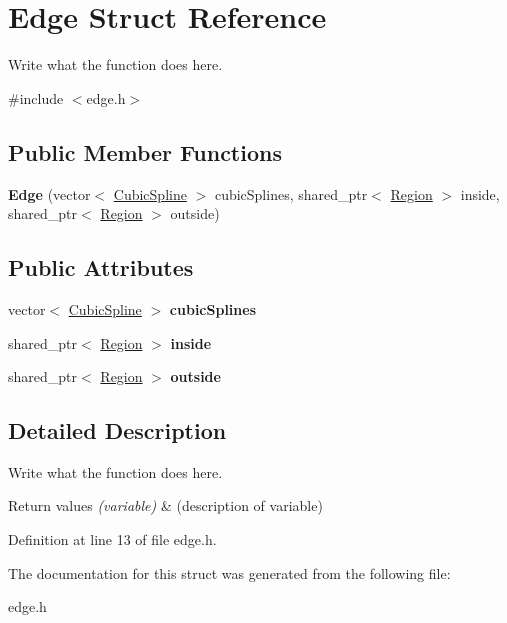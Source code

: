 \hypertarget{structEdge}{\section{Edge Struct Reference}
\label{structEdge}
}


Write what the function does here.  




{\ttfamily \#include $<$edge.\+h$>$}

\subsection*{Public Member Functions}
\begin{DoxyCompactItemize}
\item 
\hypertarget{structEdge_ae88b2eacc8420832ac0b4642e42177f1}{{\bfseries Edge} (vector$<$ \hyperlink{structCubicSpline}{Cubic\+Spline} $>$ cubic\+Splines, shared\+\_\+ptr$<$ \hyperlink{structRegion}{Region} $>$ inside, shared\+\_\+ptr$<$ \hyperlink{structRegion}{Region} $>$ outside)}\label{structEdge_ae88b2eacc8420832ac0b4642e42177f1}

\end{DoxyCompactItemize}
\subsection*{Public Attributes}
\begin{DoxyCompactItemize}
\item 
\hypertarget{structEdge_a3e6e9829abcffa41c78a09de513e2734}{vector$<$ \hyperlink{structCubicSpline}{Cubic\+Spline} $>$ {\bfseries cubic\+Splines}}\label{structEdge_a3e6e9829abcffa41c78a09de513e2734}

\item 
\hypertarget{structEdge_a8fe1ad8fd85914e617fb6084440fd863}{shared\+\_\+ptr$<$ \hyperlink{structRegion}{Region} $>$ {\bfseries inside}}\label{structEdge_a8fe1ad8fd85914e617fb6084440fd863}

\item 
\hypertarget{structEdge_a827600852145737ed547bb3fd75c7c47}{shared\+\_\+ptr$<$ \hyperlink{structRegion}{Region} $>$ {\bfseries outside}}\label{structEdge_a827600852145737ed547bb3fd75c7c47}

\end{DoxyCompactItemize}


\subsection{Detailed Description}
Write what the function does here. 


\begin{DoxyRetVals}{Return values}
{\em (variable)} & (description of variable) \\
\hline
\end{DoxyRetVals}


Definition at line 13 of file edge.\+h.



The documentation for this struct was generated from the following file\+:\begin{DoxyCompactItemize}
\item 
edge.\+h\end{DoxyCompactItemize}
